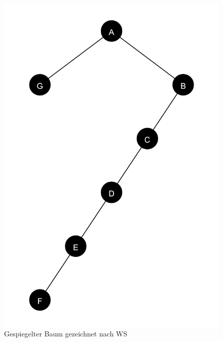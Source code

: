 \begin{figure}[h]
\begin{minipage}[t]{0.45\linewidth}
        \includegraphics[scale = 0.075]{abbildungen/tree_spiegel_2_a2}
        \caption[]{Gespiegelter Baum gezeichnet nach WS}
    \end{minipage}
    \label{pic:WS_Spiegel} 
\end{figure}


